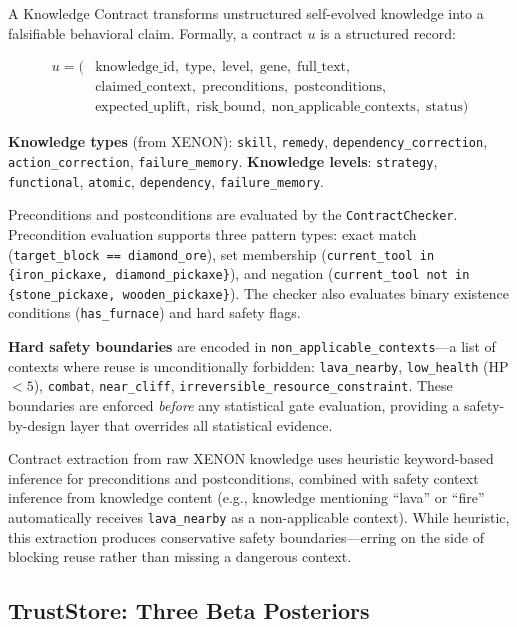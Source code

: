 \documentclass[letterpaper]{article}
\begin{document}
A Knowledge Contract transforms unstructured self-evolved knowledge into a falsifiable behavioral claim. Formally, a contract $u$ is a structured record:

\begin{align}
u = (& \text{knowledge\_id}, \; \text{type}, \; \text{level}, \; \text{gene}, \; \text{full\_text}, \nonumber\\
     & \text{claimed\_context}, \; \text{preconditions}, \; \text{postconditions}, \nonumber\\
     & \text{expected\_uplift}, \; \text{risk\_bound}, \; \text{non\_applicable\_contexts}, \; \text{status})
\end{align}

\textbf{Knowledge types} (from \textsc{XENON}): \texttt{skill}, \texttt{remedy}, \texttt{dependency\_correction}, \texttt{action\_correction}, \texttt{failure\_memory}. \textbf{Knowledge levels}: \texttt{strategy}, \texttt{functional}, \texttt{atomic}, \texttt{dependency}, \texttt{failure\_memory}.

Preconditions and postconditions are evaluated by the \texttt{ContractChecker}. Precondition evaluation supports three pattern types: exact match (\texttt{target\_block == diamond\_ore}), set membership (\texttt{current\_tool in \{iron\_pickaxe, diamond\_pickaxe\}}), and negation (\texttt{current\_tool not in \{stone\_pickaxe, wooden\_pickaxe\}}). The checker also evaluates binary existence conditions (\texttt{has\_furnace}) and hard safety flags.

\textbf{Hard safety boundaries} are encoded in \texttt{non\_applicable\_contexts}---a list of contexts where reuse is unconditionally forbidden: \texttt{lava\_nearby}, \texttt{low\_health} (HP $< 5$), \texttt{combat}, \texttt{near\_cliff}, \texttt{irreversible\_resource\_constraint}. These boundaries are enforced \emph{before} any statistical gate evaluation, providing a safety-by-design layer that overrides all statistical evidence.

Contract extraction from raw \textsc{XENON} knowledge uses heuristic keyword-based inference for preconditions and postconditions, combined with safety context inference from knowledge content (e.g., knowledge mentioning ``lava'' or ``fire'' automatically receives \texttt{lava\_nearby} as a non-applicable context). While heuristic, this extraction produces conservative safety boundaries---erring on the side of blocking reuse rather than missing a dangerous context.

\subsection{TrustStore: Three Beta Posteriors}
\end{document}
